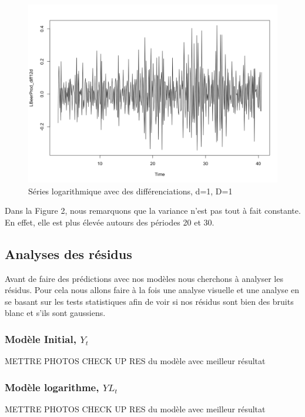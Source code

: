 \documentclass[12pt,a4paper]{book}
\newcommand{\1}{\mathds{1}}
\begin{document}
\begin{figure}[h]
 \centering
  \includegraphics[scale=0.3]{Log_Avecd1D1}  
\caption{Séries logarithmique avec des différenciations, d=1, D=1 }
\label{fig:1}
\end{figure}

Dans la Figure 2, nous remarquons que la variance n'est pas tout à fait constante. En effet, elle est plus élevée autours des périodes 20 et 30. 

\vspace{5 mm}
\subsection{Analyses des résidus}
Avant de faire des prédictions avec nos modèles nous cherchons à analyser les résidus. Pour cela nous allons faire à la fois une analyse visuelle et une analyse en se basant sur les tests statistiques afin de voir si nos résidus sont bien des bruits blanc et s'ils sont gaussiens.

\subsubsection{Modèle Initial, $Y_t$}

METTRE PHOTOS CHECK UP RES du modèle avec meilleur résultat

\subsubsection{Modèle logarithme, $YL_t$}

METTRE PHOTOS CHECK UP RES du modèle avec meilleur résultat
\end{document}
